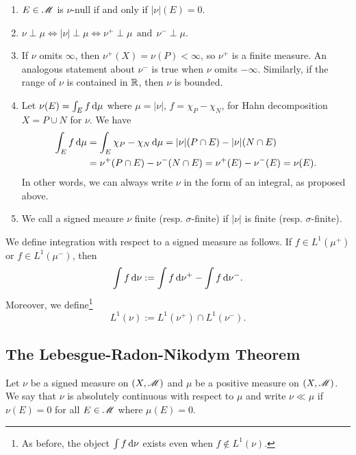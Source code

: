 \documentclass[12pt]{article} %
\begin{document}
\begin{remark}
    \begin{enumerate}
        \item $E \in \mathscr{M}$ is $\nu$-null if and only if $|\nu|(E) = 0$.
        \item $\nu \perp \mu \iff |\nu| \perp \mu \iff \nu^+ \perp \mu \ \ \text{and} \ \ \nu^- \perp \mu$.
        \item If $\nu$ omits $\infty$, then $\nu^+(X) = \nu(P) < \infty$, so $\nu^+$ is a finite measure. An analogous statement about $\nu^-$ is true when $\nu$ omits $-\infty$. Similarly, if the range of $\nu$ is contained in $\mathbb{R}$, then $\nu$ is bounded.
        \item Let $\nu(E) = \int_E f \, \mathrm{d} \mu$ where $\mu = |\nu|$, $f = \chi_P - \chi_N$, for Hahn decomposition $X = P \cup N$ for $\nu$. We have \begin{align*}
            \int_E f \, \mathrm{d} \mu &= \int_E \chi_P - \chi_N \, \mathrm{d} \mu  = |\nu|(P \cap E) - |\nu|(N \cap E) \\&= \nu^+(P \cap E) - \nu^-(N \cap E) = \nu^+(E) - \nu^-(E) = \nu(E).
        \end{align*}
        In other words, we can always write $\nu$ in the form of an integral, as proposed above.
        \item We call a signed meaure $\nu$ finite (resp. $\sigma$-finite) if $|\nu|$ is finite (resp. $\sigma$-finite).
    \end{enumerate}
\end{remark}

\begin{definition}
    We define integration with respect to a signed measure as follows. If $f \in L^1(\mu^+)$ or $f \in L^1(\mu^-)$, then \[\int f \, \mathrm{d} \nu := \int f \, \mathrm{d} \nu^+ - \int f \, \mathrm{d} \nu^-.\] Moreover, we define\footnote{As before, the object $\int f \, \mathrm{d} \nu$ exists even when $f \notin L^1(\nu)$.} \[L^1(\nu) := L^1(\nu^+) \cap L^1(\nu^-).\]
\end{definition}

\subsection{The Lebesgue-Radon-Nikodym Theorem}

\begin{definition}
    Let $\nu$ be a signed measure on $(X, \mathscr{M})$ and $\mu$ be a positive measure on $(X, \mathscr{M})$. We say that $\nu$ is absolutely continuous with respect to $\mu$ and write $\nu \ll \mu$ if $\nu(E) = 0$ for all $E \in \mathscr{M}$ where $\mu(E) = 0$.
\end{definition}
\end{document}
